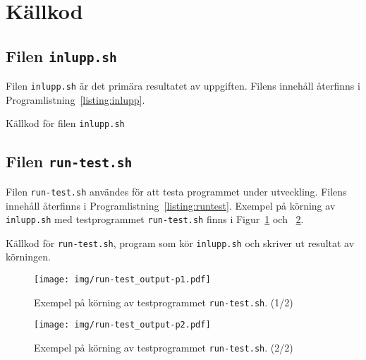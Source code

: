 %
%
%


\section{Källkod}

\subsection{Filen \texttt{inlupp.sh}}
Filen \texttt{inlupp.sh} är det primära resultatet av uppgiften.  
Filens innehåll återfinns i Programlistning~\ref{listing:inlupp}.

  \caption{Källkod för filen \texttt{inlupp.sh}}
  \label{listing:inlupp}

\subsection{Filen \texttt{run-test.sh}}
Filen \texttt{run-test.sh} användes för att testa programmet under utveckling.
Filens innehåll återfinns i Programlistning~\ref{listing:runtest}.  Exempel på
körning av \texttt{inlupp.sh} med testprogrammet \texttt{run-test.sh} finns i
Figur~\ref{fig:runtest1} och ~\ref{fig:runtest2}.

  \caption{Källkod för \texttt{run-test.sh}, program som kör \texttt{inlupp.sh}
           och skriver ut resultat av körningen.}
  \label{listing:runtest}

\begin{figure}[htp]
  \centering 
  \texttt{[image: img/run-test\_output-p1.pdf]}
  \caption{Exempel på körning av testprogrammet \texttt{run-test.sh}. (1/2)}
  \label{fig:runtest1}
\end{figure}

\begin{figure}[htp]
  \centering 
  \texttt{[image: img/run-test\_output-p2.pdf]}
  \caption{Exempel på körning av testprogrammet \texttt{run-test.sh}. (2/2)}
  \label{fig:runtest2}
\end{figure}
